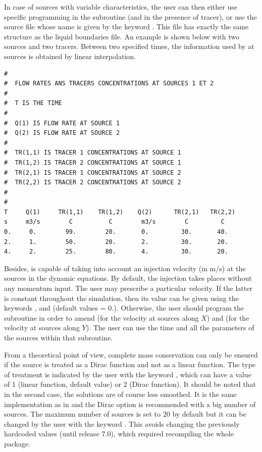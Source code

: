 In case of sources with variable characteristics, the user can then either use
specific programming in the  subroutine (and
 in the presence of tracer), or use the source file
whose name is given by the keyword .
This file has exactly the same structure as the liquid
boundaries file. An example is shown below with two sources and two tracers.
Between two specified times, the information used by  at sources is
obtained by linear interpolation.

\begin{lstlisting}[language=TelemacCas]
#
#  FLOW RATES ANS TRACERS CONCENTRATIONS AT SOURCES 1 ET 2
#
#  T IS THE TIME
#
#  Q(1) IS FLOW RATE AT SOURCE 1
#  Q(2) IS FLOW RATE AT SOURCE 2
#
#  TR(1,1) IS TRACER 1 CONCENTRATIONS AT SOURCE 1
#  TR(1,2) IS TRACER 2 CONCENTRATIONS AT SOURCE 1
#  TR(2,1) IS TRACER 1 CONCENTRATIONS AT SOURCE 2
#  TR(2,2) IS TRACER 2 CONCENTRATIONS AT SOURCE 2
#
#
T     Q(1)     TR(1,1)    TR(1,2)    Q(2)      TR(2,1)   TR(2,2)
s     m3/s        C          C        m3/s        C         C
0.     0.        99.        20.       0.         30.       40.
2.     1.        50.        20.       2.         30.       20.
4.     2.        25.        80.       4.         30.       20.
\end{lstlisting}

Besides,  is capable of taking into account an injection velocity (in
m/s) at the sources in the dynamic equations. By default, the injection takes
places without any momentum input. The user may prescribe a particular
velocity. If the latter is constant throughout the simulation, then its value
can be given using the keywords ,
 and
 (default values = 0.).
Otherwise, the user should program the  subroutine
in order to amend  (for the
velocity at sources along $X$) and  (for the velocity at sources
along $Y$). The user can use the time and all the parameters of the sources
within that subroutine.

From a theoretical point of view, complete mass conservation can only be ensured
if the source is treated as a Dirac function and not as a linear function.
The type of treatment is indicated by the user with the keyword
, which can have a value of 1 (linear function,
default value) or 2 (Dirac function).
It should be noted that in the second case, the solutions are of course
less smoothed.
It is the same implementation as in  and the Dirac option is
recommended with a big number of sources.
The maximum number of sources is set to 20 by default but it can be changed
by the user with the keyword .
This avoids changing the previously hardcoded values (until release 7.0),
which required recompiling the whole package.

